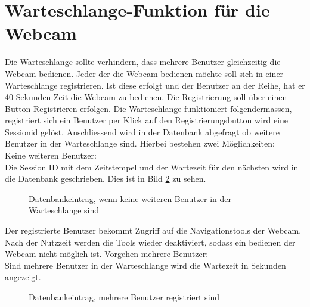 \section{Warteschlange-Funktion  für die Webcam}

Die Warteschlange sollte verhindern, dass mehrere Benutzer gleichzeitig die Webcam bedienen. Jeder der die Webcam bedienen möchte soll sich in einer Warteschlange registrieren. Ist diese erfolgt und der Benutzer an der Reihe, hat er 40 Sekunden Zeit die Webcam zu bedienen. Die Registrierung soll über einen Button Registrieren erfolgen. Die Warteschlange funktioniert folgendermassen, registriert sich ein Benutzer per Klick auf den Registrierungsbutton wird eine Sessionid gelöst. Anschliessend wird in der Datenbank abgefragt ob weitere Benutzer in der Warteschlange sind. Hierbei bestehen zwei Möglichkeiten:\\

Keine weiteren Benutzer:\\
Die Session ID mit dem Zeitstempel und der Wartezeit für den nächsten wird in die Datenbank geschrieben. Dies ist in Bild \ref{img:tblqueue} zu sehen.
\begin{figure}[h!]
	\centering
	\caption{Datenbankeintrag, wenn keine weiteren Benutzer in der Warteschlange sind}
	\label{img:tblqueue}
\end{figure}

Der registrierte Benutzer bekommt Zugriff auf die Navigationstools der Webcam. Nach der Nutzzeit werden die Tools wieder deaktiviert, sodass ein bedienen der Webcam nicht möglich ist. 
Vorgehen mehrere Benutzer:\\

Sind mehrere Benutzer in der Warteschlange wird die Wartezeit in Sekunden angezeigt. 
\begin{figure}[h!]
	\centering
	\caption{Datenbankeintrag, mehrere Benutzer registriert sind}
	\label{img:tblqueue}
\end{figure}

